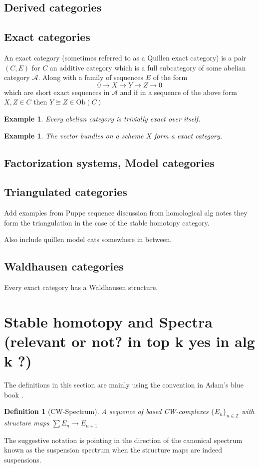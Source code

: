 \documentclass[12pt]{article}
\numberwithin{equation}{section}
\newcounter{dummy} \numberwithin{dummy}{section}
\newtheorem{definition}[dummy]{Definition}
\newtheorem{example}[dummy]{Example}
\begin{document}
\begin{appendices}
	\subsection{Derived categories}
	\subsection{Exact categories}
	An exact category (sometimes referred to as a Quillen exact category) is a pair $(C,E)$ for $C$ an additive category which is a full subcategory of some abelian category $\mathcal{A}$. Along with a family of sequences $E$ of the form \[ 0 \to X \to Y \to Z \to 0 \] which are short exact sequences in $\mathcal{A}$ and if in a sequence of the above form $X, Z \in C$ then $Y \cong Z \in \mathrm{Ob}(C)$
	\begin{example}
		Every abelian category is trivially exact over itself.
	\end{example}
	\begin{example}
		The vector bundles on a scheme $X$ form a exact category.
	\end{example}
	\subsection{Factorization systems, Model categories}
	\subsection{Triangulated categories}
	Add examples from Puppe sequence discussion from homological alg notes they form the triangulation in the case of the stable homotopy category.
	
	Also include quillen model cats somewhere in between.
	
	\subsection{Waldhausen categories}
	Every exact category has a Waldhausen structure.
	\section{Stable homotopy and Spectra (relevant or not? in top k yes in alg k ?) }
	The definitions in this section are mainly using the convention in Adam's blue book \cite{adams1974stable}.
	\begin{definition}[CW-Spectrum]
		A sequence of based CW-complexes $\{E_n\}_{n \in \mathbb{Z}}$ with structure maps $\sum E_n \to E_{n+1}$
	\end{definition}
	The suggestive notation is pointing in the direction of the canonical spectrum known as the suspension spectrum when the structure maps are indeed suspensions.
	\end{appendices}
\end{document}
